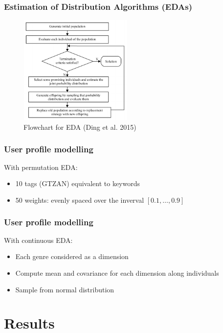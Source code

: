 \documentclass{beamer}
\begin{document}
\begin{frame}
	\frametitle{Estimation of Distribution Algorithms (EDAs)}
	\begin{figure}[ht!]
		\centering
		\includegraphics[width=0.5\textwidth]{eda.png}
		\caption{Flowchart for EDA (Ding et al. 2015)}
	\end{figure}
\end{frame}
\begin{frame}
	\frametitle{User profile modelling}
	With permutation EDA:
	\begin{itemize}
	\item 10 tags (GTZAN) equivalent to keywords
	\item 50 weights: evenly spaced over the inverval $[0.1,\ldots,0.9]$
	\end{itemize}
	\frametitle{User profile modelling}
	With continuous EDA:
	\begin{itemize}
		\item Each genre considered as a dimension
		\item Compute mean and covariance for each dimension along individuals
		\item Sample from normal distribution
	\end{itemize}
\end{frame}

\section{Results}
\end{document}
